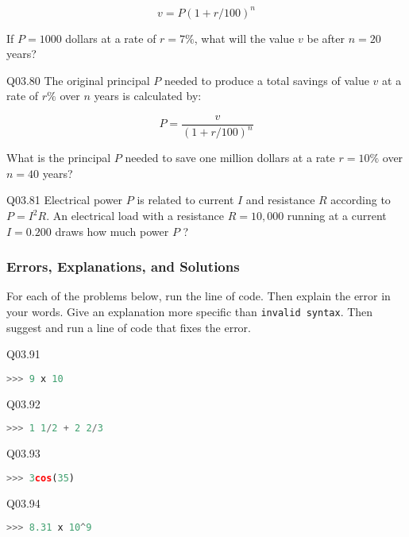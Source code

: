 \documentclass{book}
\newenvironment{problems}{}{}  %
\newcommand{\passthrough}[1]{#1}
\begin{document}
\begin{problems}
\[ v = P(1 + r/100)^n \]

If \(P=1000\) dollars at a rate of \(r=7\%\), what will the value \(v\)
be after \(n=20\) years?

Q03.80 The original principal \(P\) needed to produce a total savings of
value \(v\) at a rate of \(r\%\) over \(n\) years is calculated by:

\[ P = \frac{v}{(1+r/100)^n} \]

What is the principal \(P\) needed to save one million dollars at a rate
\(r=10\%\) over \(n=40\) years?

Q03.81 Electrical power \(P\) is related to current \(I\) and resistance
\(R\) according to \(P = I^2R\). An electrical load with a resistance
\(R = 10,000\) running at a current \(I=0.200\) draws how much power
\(P\) ?
        \end{problems}

    




    
        \hypertarget{errors-explanations-and-solutions}{%
\subsubsection{Errors, Explanations, and
Solutions}\label{errors-explanations-and-solutions}}

For each of the problems below, run the line of code. Then explain the
error in your words. Give an explanation more specific than
\passthrough{\lstinline!invalid syntax!}. Then suggest and run a line of
code that fixes the error.

Q03.91

\begin{lstlisting}[language=Python]
>>> 9 x 10
\end{lstlisting}

Q03.92

\begin{lstlisting}[language=Python]
>>> 1 1/2 + 2 2/3
\end{lstlisting}

Q03.93

\begin{lstlisting}[language=Python]
>>> 3cos(35)
\end{lstlisting}

Q03.94

\begin{lstlisting}[language=Python]
>>> 8.31 x 10^9
\end{lstlisting}
\end{document}
